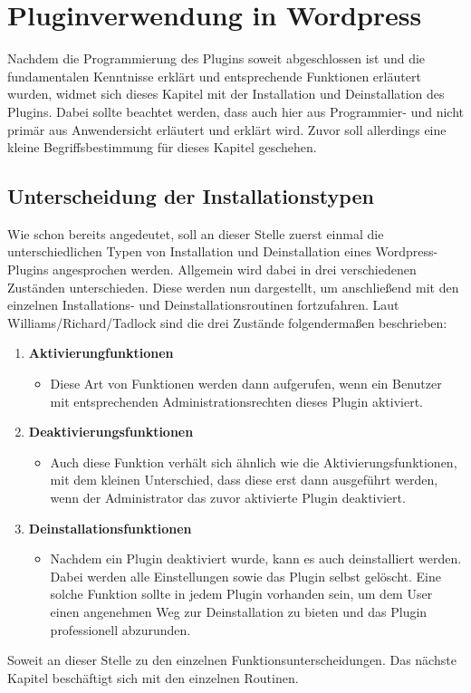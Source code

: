 \section{Pluginverwendung in Wordpress}\label{PLASDA}
Nachdem die Programmierung des Plugins soweit abgeschlossen ist und die fundamentalen Kenntnisse erklärt und entsprechende Funktionen erläutert wurden, widmet sich dieses Kapitel mit der Installation und Deinstallation des Plugins. \newline
Dabei sollte beachtet werden, dass auch hier aus Programmier- und nicht primär aus Anwendersicht erläutert und erklärt wird.
Zuvor soll allerdings eine kleine Begriffsbestimmung für dieses Kapitel geschehen.
\subsection{Unterscheidung der Installationstypen}
Wie schon bereits angedeutet, soll an dieser Stelle zuerst einmal die unterschiedlichen Typen von Installation und Deinstallation eines Wordpress-Plugins angesprochen werden. Allgemein wird dabei in drei verschiedenen Zuständen unterschieden. Diese werden nun dargestellt, um anschließend mit den einzelnen Installations- und Deinstallationsroutinen fortzufahren.\newline
Laut Williams/Richard/Tadlock sind die drei Zustände folgendermaßen beschrieben:
\begin{enumerate}
	\item \textbf{Aktivierungfunktionen}
	\begin{itemize}
		\item Diese Art von Funktionen werden dann aufgerufen, wenn ein Benutzer mit entsprechenden Administrationsrechten dieses Plugin aktiviert. 
\end{itemize}		
	\item \textbf{Deaktivierungsfunktionen}
	\begin{itemize}
		\item Auch diese Funktion verhält sich ähnlich wie die Aktivierungsfunktionen, mit dem kleinen Unterschied, dass diese erst dann ausgeführt werden, wenn der Administrator das zuvor aktivierte Plugin deaktiviert.
	\end{itemize}
	\item \textbf{Deinstallationsfunktionen}
	\begin{itemize}
		\item Nachdem ein Plugin deaktiviert wurde, kann es auch deinstalliert werden. Dabei werden alle Einstellungen sowie das Plugin selbst gelöscht. Eine solche Funktion sollte in jedem Plugin vorhanden sein, um dem User einen angenehmen Weg zur Deinstallation zu bieten und das Plugin professionell abzurunden.
	\end{itemize}
\end{enumerate}
Soweit an dieser Stelle zu den einzelnen Funktionsunterscheidungen. Das nächste Kapitel beschäftigt sich mit den einzelnen Routinen.
